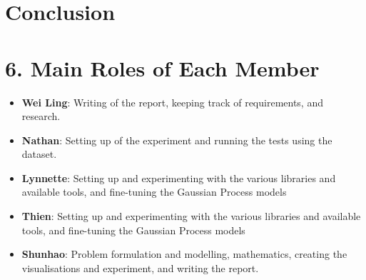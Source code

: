 \documentclass[letterpaper]{article}
\begin{document}
\section{Conclusion}



\section{6. Main Roles of Each Member}
\begin{itemize}
\item \textbf{Wei Ling}: 
Writing of the report, keeping track of requirements, and research.
\item \textbf{Nathan}: 
Setting up of the experiment and running the tests using the dataset.
\item \textbf{Lynnette}: 
Setting up and experimenting with the various libraries and available tools, and fine-tuning the Gaussian Process models
\item \textbf{Thien}: 
Setting up and experimenting with the various libraries and available tools, and fine-tuning the Gaussian Process models
\item \textbf{Shunhao}: 
Problem formulation and modelling, mathematics, creating the visualisations and experiment, and writing the report.\cite{manning_introduction_2008}
\end{itemize}



\end{document}
